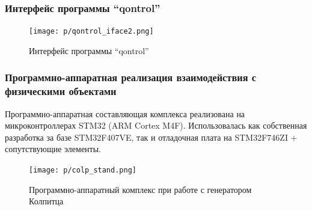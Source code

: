 \documentclass[10pt,utf8]{beamer}
\begin{document}

\begin{frame}
  \frametitle{Интерфейс программы ``qontrol''}

  \begin{figure}[ht!]
    \centerline{\texttt{[image: p/qontrol\_iface2.png]} }
    \caption{Интерфейс программы ``qontrol'' }
    \label{atu:qontrol_iface}
  \end{figure}

\end{frame}




\begin{frame}
  \frametitle{Программно-аппаратная реализация взаимодействия с физическими объектами}

  Программно-аппаратная составляющая комплекса реализована
  на микроконтроллерах STM32 (ARM Cortex M4F).
  Использовалась как собственная разработка за базе STM32F407VE,
  так и отладочная плата на STM32F746ZI + сопутствующие элементы.

  \begin{figure}[ht!]
    \centerline{\texttt{[image: p/colp\_stand.png]} }
    \caption{Программно-аппаратный комплекс при работе с генератором Колпитца}
    \label{atu:colp_stand}
  \end{figure}


\end{frame}


%
%
%
%
%
%
%
%
%



\end{document}
